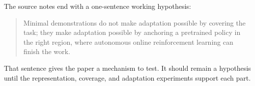 The source notes end with a one-sentence working hypothesis:

\begin{quote}
Minimal demonstrations do not make adaptation possible by covering the task;
they make adaptation possible by anchoring a pretrained policy in the right
region, where autonomous online reinforcement learning can finish the work.
\end{quote}

That sentence gives the paper a mechanism to test. It should remain a
hypothesis until the representation, coverage, and adaptation experiments
support each part.
